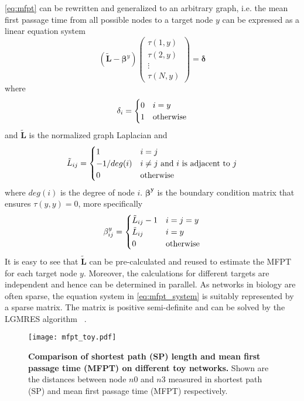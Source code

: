 \ref{eq:mfpt} can be rewritten and generalized to an arbitrary graph, i.e.
the mean first passage time from all possible nodes to a target node $y$
can be expressed as a linear equation system
\begin{equation}
(\tilde{\mathbf{L}}-\boldsymbol{\beta}^y) 
\begin{pmatrix}
\tau(1,y)\\
\tau(2,y)\\
\vdots\\
\tau(N,y)
\end{pmatrix}
= \boldsymbol{\delta}
\label{eq:mfpt_system}
\end{equation}
where 
\begin{equation}
\delta_i=
\begin{cases}
0 & i=y\\
1 & \textnormal{otherwise}
\end{cases}
\end{equation}
and $\tilde{\mathbf{L}}$ is the normalized graph Laplacian and
\begin{equation}
\tilde{L}_{ij}=
\begin{cases}
1 & i=j\\
-1/deg(i) & i \neq j \ \textnormal{and}\ i \ \textnormal{is adjacent to}\ j \\
0 & \textnormal{otherwise}
\end{cases}
\end{equation}
where $deg(i)$ is the degree of node $i$. $\boldsymbol{\beta^y}$ 
is the boundary condition
matrix that ensures $\tau(y,y)=0$, more specifically
\begin{equation}
\beta^y_{ij}=
\begin{cases}
\tilde{L}_{ij}-1 & i=j=y\\
\tilde{L}_{ij} & i=y\\
0 & \textnormal{otherwise}
\end{cases}
\end{equation}
It is easy to see that $\tilde{\mathbf{L}}$ can be pre-calculated and 
reused to estimate the
MFPT for each target node $y$. Moreover, the calculations
for different targets are independent and hence can be
determined in parallel. As networks in biology are often
sparse, the equation system in \ref{eq:mfpt_system}
is suitably represented by a sparse matrix. The matrix
is positive semi-definite and can be solved by the LGMRES algorithm~%
\citep{Baker2005}.

\begin{figure}[!ht]
\begin{center}
\texttt{[image: mfpt\_toy.pdf]}
\end{center}
\caption[Toy example of SP and MFPT on different topologies]{
{\bf Comparison of shortest path (SP) length and mean first passage time 
(MFPT) on different toy networks.}
Shown are the distances between node $n0$ and $n3$ measured in shortest path 
(SP) and mean first passage time (MFPT) respectively.
}
\label{fig:mfpt_toy}
\end{figure}

